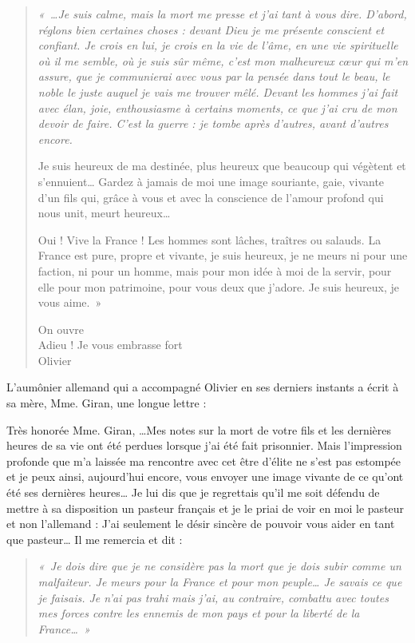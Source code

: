 \begin{quote}\itshape
«~…Je suis calme, mais la mort me presse et j’ai tant à vous dire. D’abord, réglons bien certaines choses :
devant Dieu je me présente conscient et confiant. Je crois en lui, je crois en la vie de l’âme, en une vie spirituelle
où il me semble, où je suis sûr même, c’est mon malheureux cœur qui m’en assure, que je communierai avec
vous par la pensée dans tout le beau, le noble le juste auquel je vais me trouver mêlé.
Devant les hommes j’ai fait avec élan, joie, enthousiasme à certains moments, ce que j’ai cru de mon devoir de
faire. C’est la guerre : je tombe après d’autres, avant d’autres encore.

Je suis heureux de ma destinée, plus heureux que beaucoup qui végètent et s’ennuient… Gardez à jamais de moi
une image souriante, gaie, vivante d’un fils qui, grâce à vous et avec la conscience de l’amour profond qui nous
unit, meurt heureux…

Oui ! Vive la France ! Les hommes sont lâches, traîtres ou salauds. La France est pure, propre et vivante, je suis
heureux, je ne meurs ni pour une faction, ni pour un homme, mais pour mon idée à moi de la servir, pour elle
pour mon patrimoine, pour vous deux que j’adore.
Je suis heureux, je vous aime.~»

\begin{flushright}
On ouvre\\
Adieu ! Je vous embrasse fort\\
Olivier
\end{flushright}

\end{quote}

L’aumônier allemand qui a accompagné Olivier en ses derniers instants a écrit à sa mère, Mme.
Giran, une longue lettre :

Très honorée Mme. Giran,
…Mes notes sur la mort de votre fils et les dernières heures de sa vie ont été perdues lorsque j’ai
été fait prisonnier. Mais l’impression profonde que m’a laissée ma rencontre avec cet être d’élite
ne s’est pas estompée et je peux ainsi, aujourd’hui encore, vous envoyer une image vivante de ce
qu’ont été ses dernières heures…
Je lui dis que je regrettais qu’il me soit défendu de mettre à sa disposition un pasteur français et je
le priai de voir en moi le pasteur et non l’allemand : J’ai seulement le désir sincère de pouvoir
vous aider en tant que pasteur… Il me remercia et dit :

\begin{quote}\itshape
«~Je dois dire que je ne considère pas la mort que je dois subir comme un malfaiteur. Je meurs pour la
France et pour mon peuple… Je savais ce que je faisais. Je n’ai pas trahi mais j’ai, au contraire, combattu
avec toutes mes forces contre les ennemis de mon pays et pour la liberté de la France…~»
\end{quote}


